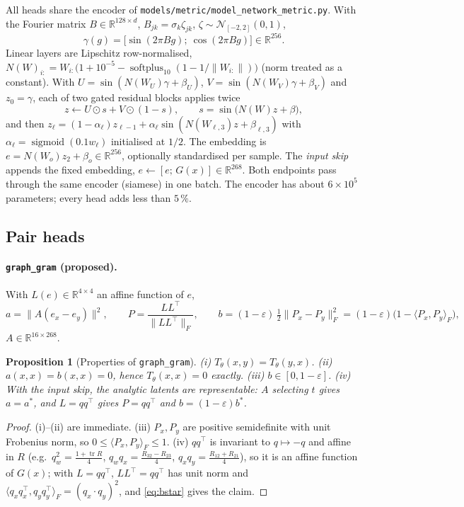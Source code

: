 \documentclass[11pt]{article}
\newtheorem{proposition}{Proposition}
\newcommand{\R}{\mathbb{R}}
\newcommand{\tr}{\operatorname{tr}}
\newcommand{\code}[1]{\texttt{#1}}
\newcommand{\pct}{\,\%}
\begin{document}
All heads share the encoder of \code{models/metric/model\_network\_metric.py}. With the Fourier
matrix $B\in\R^{128\times d}$, $B_{jk}=\sigma_k\zeta_{jk}$, $\zeta\sim\mathcal N_{[-2,2]}(0,1)$,
\begin{equation}
\gamma(g)=\bigl[\sin(2\pi Bg);\ \cos(2\pi Bg)\bigr]\in\R^{256}.
\end{equation}
Linear layers are Lipschitz row-normalised, $N(W)_{i:}=W_{i:}\bigl(1+10^{-5}-\operatorname{softplus}_{10}
(1-1/\|W_{i:}\|)\bigr)$ (norm treated as a constant). With $U=\sin(N(W_U)\gamma+\beta_U)$,
$V=\sin(N(W_V)\gamma+\beta_V)$ and $z_0=\gamma$, each of two gated residual blocks applies twice
\begin{equation}
z\leftarrow U\odot s+V\odot(1-s),\qquad s=\sin\bigl(N(W)z+\beta\bigr),
\end{equation}
and then $z_\ell=(1-\alpha_\ell)z_{\ell-1}+\alpha_\ell\sin(N(W_{\ell,3})z+\beta_{\ell,3})$ with
$\alpha_\ell=\operatorname{sigmoid}(0.1w_\ell)$ initialised at $1/2$. The embedding is
$e=N(W_o)z_2+\beta_o\in\R^{256}$, optionally standardised per sample. The \emph{input skip} appends
the fixed embedding, $e\leftarrow[e;\,G(x)]\in\R^{268}$. Both endpoints pass through the same encoder
(siamese) in one batch. The encoder has about $6\times10^5$ parameters; every head adds less than
$5\pct$.

\subsection{Pair heads}

\paragraph{\code{graph\_gram} (proposed).} With $L(e)\in\R^{4\times4}$ an affine function of $e$,
\begin{equation}
a=\|A(e_x-e_y)\|^2,\qquad P=\frac{LL^\top}{\|LL^\top\|_F},\qquad
b=(1-\varepsilon)\,\tfrac12\|P_x-P_y\|_F^2=(1-\varepsilon)\bigl(1-\langle P_x,P_y\rangle_F\bigr),
\label{eq:gram}
\end{equation}
$A\in\R^{16\times268}$.

\begin{proposition}[Properties of \code{graph\_gram}]\label{prop:gram}
(i) $T_\theta(x,y)=T_\theta(y,x)$. (ii) $a(x,x)=b(x,x)=0$, hence $T_\theta(x,x)=0$ exactly.
(iii) $b\in[0,1-\varepsilon]$. (iv) With the input skip, the analytic latents are representable:
$A$ selecting $t$ gives $a=a^*$, and $L=qq^\top$ gives $P=qq^\top$ and $b=(1-\varepsilon)b^*$.
\end{proposition}
\begin{proof}
(i)--(ii) are immediate. (iii) $P_x,P_y$ are positive semidefinite with unit Frobenius norm, so
$0\le\langle P_x,P_y\rangle_F\le1$. (iv) $qq^\top$ is invariant to $q\mapsto-q$ and affine in $R$
(e.g.\ $q_w^2=\frac{1+\tr R}{4}$, $q_wq_x=\frac{R_{32}-R_{23}}{4}$, $q_xq_y=\frac{R_{12}+R_{21}}{4}$),
so it is an affine function of $G(x)$; with $L=qq^\top$, $LL^\top=qq^\top$ has unit norm and
$\langle q_xq_x^\top,q_yq_y^\top\rangle_F=(q_x\cdot q_y)^2$, and \eqref{eq:bstar} gives the claim.
\end{proof}
\end{document}
